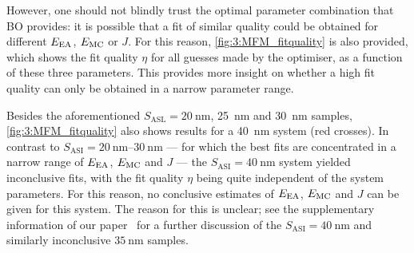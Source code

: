 \vspace{-1em}

However, one should not blindly trust the optimal parameter combination that BO provides: it is possible that a fit of similar quality could be obtained for different $E_\mathrm{EA}$, $E_\mathrm{MC}$ or $J$.
For this reason, \cref{fig:3:MFM_fitquality} is also provided, which shows the fit quality $\eta$ for all guesses made by the optimiser, as a function of these three parameters.
This provides more insight on whether a high fit quality can only be obtained in a narrow parameter range. \par
Besides the aforementioned $S_\mathrm{ASL} = \SI{20}{\nano\metre}$, \SI{25}{\nano\metre} and \SI{30}{\nano\metre} samples, \cref{fig:3:MFM_fitquality} also shows results for a \SI{40}{\nano\metre} system (red crosses).
In contrast to $S_\mathrm{ASI} = \SIrange{20}{30}{\nano\metre}$ --- for which the best fits are concentrated in a narrow range of $E_\mathrm{EA}$, $E_\mathrm{MC}$ and $J$ --- the $S_\mathrm{ASI} = \SI{40}{\nano\metre}$ system yielded inconclusive fits, with the fit quality $\eta$ being quite independent of the system parameters.
For this reason, no conclusive estimates of $E_\mathrm{EA}$, $E_\mathrm{MC}$ and $J$ can be given for this system.
The reason for this is unclear; see the supplementary information of our paper~\cite{KUR-24} for a further discussion of the $S_\mathrm{ASI} = \SI{40}{\nano\metre}$ and similarly inconclusive $\SI{35}{\nano\metre}$ samples. \\\par

